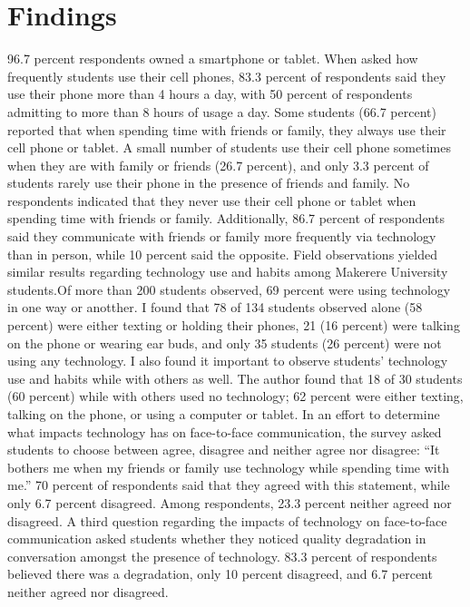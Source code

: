 \documentclass[11pt]{article} %
\begin{document}
\section{Findings}
96.7 percent respondents owned a smartphone or tablet. When asked how frequently students use their cell phones, 83.3 percent of respondents said they use their phone more than 4 hours a day, with 50 percent of respondents admitting to more than 8 hours of usage a day. Some students (66.7 percent) reported that when spending time with friends or family, they always use their cell phone or tablet. A small number of students use their cell phone sometimes when they are with family or friends (26.7 percent), and only 3.3 percent of students rarely use their phone in the presence of friends and family. No respondents indicated that they never use their cell phone or tablet when spending time with friends or family. 
\newline Additionally, 86.7 percent of respondents said they communicate with friends or family more frequently via technology than in person, while 10 percent said the opposite.  
\newline Field observations yielded similar results regarding technology use and habits among Makerere University students.Of more than 200 students observed, 69 percent were using technology in one way or anotther. I found that 78 of 134 students observed alone (58 percent) were either texting or holding their phones, 21 (16 percent) were talking on the phone or wearing ear buds, and only 35 students (26 percent) were not using any technology. 
\newline I also found it important to observe students’ technology use and habits while with others as well. The author found that 18 of 30 students (60 percent) while with others used no technology; 62 percent were either texting, talking on the phone, or using a computer or tablet. 
\newline In an effort to determine what impacts technology has on face-to-face communication, the survey asked students to choose between agree, disagree and neither agree nor disagree: “It bothers me when my friends or family use technology while spending time with me.” 70 percent of respondents said that they agreed with this statement, while only 6.7 percent disagreed. Among respondents, 23.3 percent  neither agreed nor disagreed. 
\newline A third question regarding the impacts of technology on face-to-face communication asked students whether they noticed quality degradation in conversation amongst the presence of technology. 83.3 percent of respondents believed there was a degradation, only 10 percent disagreed, and 6.7 percent neither agreed nor disagreed. 
\end{document}
